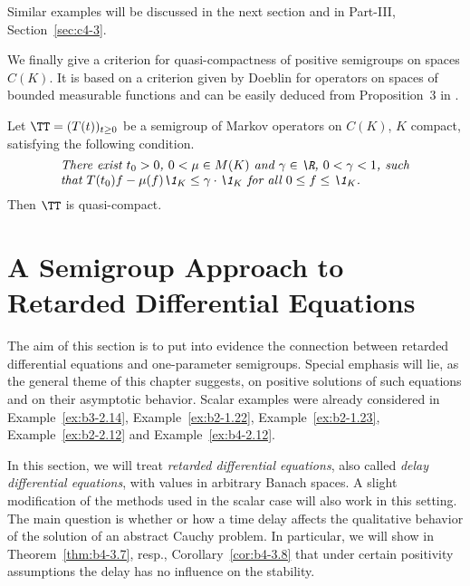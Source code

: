 Similar examples will be discussed in the next section and in  Part-III, Section~\ref{sec:c4-3}.

We finally give a criterion for quasi-compactness of positive semigroups on spaces $C(K)$. 
It is based on a criterion given by Doeblin for operators on spaces of bounded measurable functions and can be easily deduced from  Proposition~3 in \textcite{lotz:1981}.
\begin{proposition}\label{prop:b4-2.13}
%
%
	Let $\TT = (T(t))_{t \geq 0}$ be a semigroup of Markov operators on $C(K)$, $K$ compact, satisfying the following condition.
\begin{equation*}\label{eq:b4-2.12}	
\begin{minipage}{.8\textwidth}
%	
\textit{There exist $t_{0} > 0$, $ 0 < \mu \in M(K)$ and  $\gamma \in \R$, $0 < \gamma < 1 $, 
such that  $T(t_{0})f - \mu(f)\1_K \leq \gamma \cdot \1_K$  for all   $0 \leq f \leq \1_K$.}
%
\end{minipage}
\end{equation*}
Then $\TT$ is quasi-compact.
\end{proposition}
\section{A Semigroup Approach to Retarded Differential Equations}\label{sec:b4-3}
\hspace{1cm}{\Large by Annette Grabosch und Ulrich Moustakas}
\vspace{.5cm}
\newline
The aim of this section is to put into evidence the connection between retarded differential equations and one-parameter semigroups.
Special emphasis will lie, as the general theme of this chapter suggests, on positive solutions of such equations and on their asymptotic behavior.
Scalar examples were already considered in Example~\ref{ex:b3-2.14}, Example~\ref{ex:b2-1.22}, Example~\ref{ex:b2-1.23}, Example~\ref{ex:b2-2.12} and Example~\ref{ex:b4-2.12}.

In this section, we will treat \emph{retarded differential equations}, also called \emph{delay differential equations}, with values in arbitrary Banach spaces.
A slight modification of the methods used in the scalar case will also work in this setting.
The main question is whether or how a time delay affects the qualitative behavior of the solution of an abstract Cauchy problem.
In particular, we will show in Theorem~\ref{thm:b4-3.7}, resp., Corollary~\ref{cor:b4-3.8} that under certain positivity assumptions the delay has no influence on the stability.

